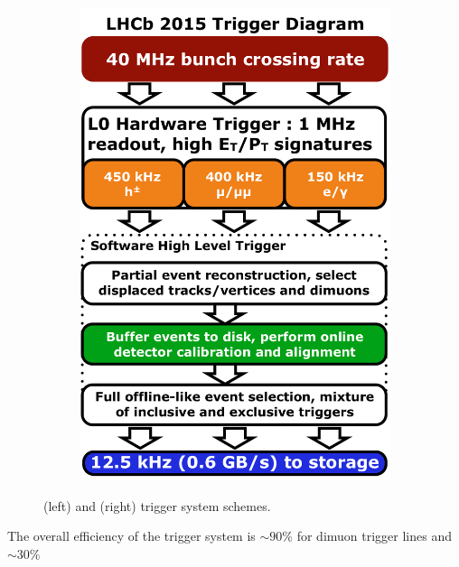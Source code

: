 \begin{figure}[t]
\begin{subfigure}{0.5\textwidth}
    \includegraphics[width=\textwidth]{Figures/Chapter2/LHCb_Trigger_RunII_May2015}
    \caption{}
    \label{det_run_two_trigger}
  \end{subfigure}
  \caption{ \runone (left) and \runtwo (right) trigger system schemes.}
  \label{det_trigger_scheams}
\end{figure}

The overall efficiency of the \lhcb trigger system is $\sim 90\%$ for dimuon trigger lines and $\sim 30\%$ 

